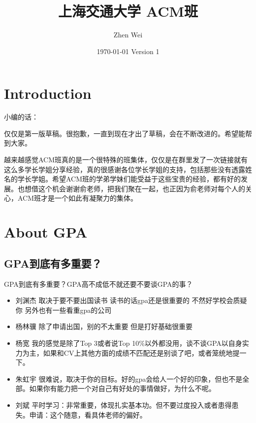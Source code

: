 \documentclass{vivid_layout}
\title{上海交通大学 ACM班}{\fontsize{37.5pt}{15pt}\selectfont 学长去哪儿}
\date{\color{white} \today{} \textbullet{} Version 1}
\author{Zhen Wei}{}
\begin{document}
\maketitle		%



\tableofcontents	%


\section{Introduction}
\addtocounter{section}{1}

小编的话：

仅仅是第一版草稿。很抱歉，一直到现在才出了草稿，会在不断改进的。希望能帮到大家。

越来越感觉ACM班真的是一个很特殊的班集体，仅仅是在群里发了一次链接就有这么多学长学姐分享经验，真的很感谢各位学长学姐的支持，包括那些没有透露姓名的学长学姐。希望ACM班的学弟学妹们能受益于这些宝贵的经验，都有好的发展。也想借这个机会谢谢俞老师，把我们聚在一起，也正因为俞老师对每个人的关心，ACM班才是一个如此有凝聚力的集体。

\section{About GPA}
\addtocounter{section}{1}
\setcounter{subsection}{0}

\subsection{GPA到底有多重要？}
GPA到底有多重要？GPA高不成低不就还要不要谈GPA的事？

\begin{itemize}
\item  { 刘渊杰}  \quad 取决于要不要出国读书 读书的话gpa还是很重要的 不然好学校会质疑你 另外也有一些看重gpa的公司
\item  { 杨林骥}  \quad 除了申请出国，别的不太重要 但是打好基础很重要
\item  { 杨宽}  \quad 我的感觉是除了Top 3或者说Top 10\%以外都没用，谈不谈GPA以自身实力为主，如果和CV上其他方面的成绩不匹配还是别谈了吧，或者笼统地提一下。
\item  { 朱虹宇}  \quad 很难说，取决于你的目标。好的gpa会给人一个好的印象，但也不是全部。如果你有能力把一个对自己有好处的事情做好，为什么不呢。 
\item  { 刘斌}  \quad 平时学习：非常重要，体现扎实基本功。但不要过度投入或者患得患失。申请：这个随意，看具体老师的偏好。
\end{itemize}
\end{document}
